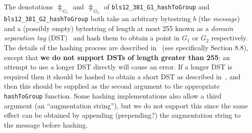 The denotations $\hash_{G_1}$ and $\hash_{G_2}$
of \texttt{bls12\_381\_G1\_hashToGroup} and
\texttt{bls12\_381\_G2\_hashToGroup} both take an arbitrary bytestring $b$ (the
\textit{message}) and a (possibly empty) bytestring of length at most 255 known as a \textit{domain
separation tag} (DST)~\cite[2.2.5]{IETF-hash-to-curve} and hash them to obtain a
point in $G_1$ or $G_2$ respectively.  The details of the hashing process are
described in~\cite{IETF-hash-to-curve} (see specifically Section 8.8), except
that
\textbf{we do not support DSTs of length greater than 255}: an attempt to use a
longer DST directly will cause an error.  If a longer DST is required then it
should be hashed to obtain a short DST as described
in~\cite[5.3.3]{IETF-hash-to-curve}, and then this should be supplied as the
second argument to the appropriate \texttt{hashToGroup} function.  Some hashing
implementations also allow a third argument (an ``augmentation string''), but we
do not support this since the same effect can be obtained by appending
(prepending?) the augmentation string to the message before hashing.

